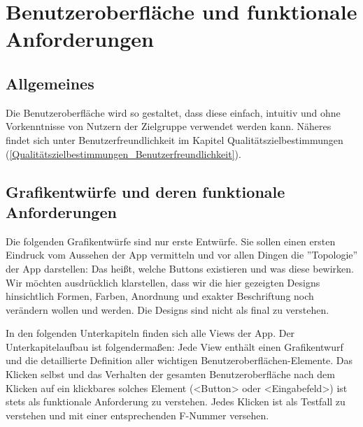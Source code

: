 \documentclass[oneside, ngerman]{sdqtechreport}
\begin{document}
\chapter{Benutzeroberfläche und funktionale Anforderungen}
\label{chap:Benutzeroberfläche}

\section{Allgemeines}
\label{sec:Benutzeroberfläche:Allgemeines}
Die Benutzeroberfläche wird so gestaltet, dass diese einfach, intuitiv und ohne Vorkenntnisse von Nutzern der Zielgruppe verwendet werden kann. Näheres findet sich unter Benutzerfreundlichkeit im Kapitel Qualitätszielbestimmungen (\ref{Qualitätszielbestimmungen_Benutzerfreundlichkeit}).


\section{Grafikentwürfe und deren funktionale Anforderungen}
\label{sec:Benutzeroberfläche:Grafiken}

Die folgenden Grafikentwürfe sind nur erste Entwürfe. Sie sollen einen ersten Eindruck vom Aussehen der App vermitteln und vor allen Dingen die ''Topologie'' der App darstellen: Das heißt, welche Buttons existieren und was diese bewirken. Wir möchten ausdrücklich klarstellen, dass wir die hier gezeigten Designs hinsichtlich Formen, Farben, Anordnung und exakter Beschriftung noch verändern wollen und werden. Die Designs sind nicht als final zu verstehen.

In den folgenden Unterkapiteln finden sich alle Views der App. Der Unterkapitelaufbau ist folgendermaßen: Jede View enthält einen Grafikentwurf und die detaillierte Definition aller wichtigen Benutzeroberflächen-Elemente. Das Klicken selbst und das Verhalten der gesamten Benutzeroberfläche nach dem Klicken auf ein klickbares solches Element (<Button> oder <Eingabefeld>) ist stets als funktionale Anforderung zu verstehen. Jedes Klicken ist als Testfall zu verstehen und mit einer entsprechenden F-Nummer versehen.
\vspace{\baselineskip} \\
\end{document}
